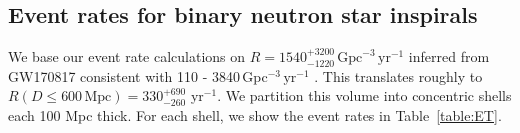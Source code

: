 \documentclass{aa}
\begin{document}
\subsection{Event rates for binary neutron star inspirals}
We base our event rate calculations on $R=1540^{+3200}_{-1220}\,\text{Gpc}^{-3}\,\text{yr}^{-1}$ inferred from GW170817 \citep{GW170817} consistent with 110 - 3840\,Gpc$^{-3}\,\text{yr}^{-1}$ \citep{LIGOScientific:2018mvr}. %
This translates roughly to $R(D\le 600\,\text{Mpc})=330^{+690}_{-260}$ {yr}$^{-1}$. %
We partition this volume into concentric shells each 100 Mpc thick. For each shell, we show the event rates in Table~\ref{table:ET}. %
%
%
%
%
\end{document}
